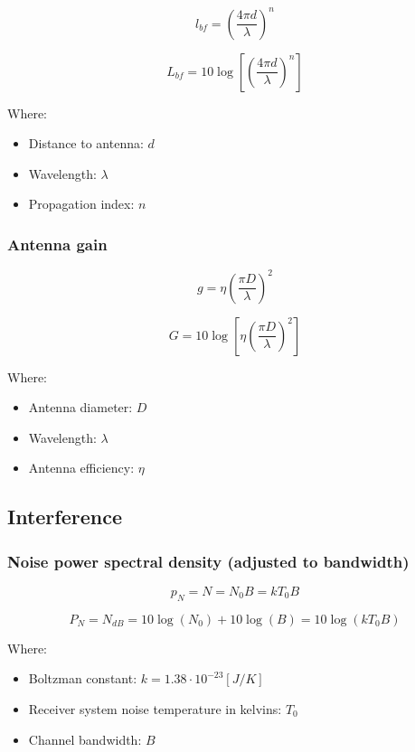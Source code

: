 \documentclass[../main.tex]{subfiles}
\begin{document}
$$
	l_{bf} = \left( \frac {4 \pi d} {\lambda} \right)^n
$$

$$
	L_{bf} = 10 \log \left[ \left( \frac {4 \pi d} {\lambda} \right)^n \right]
$$

Where:

\begin{itemize}
	\item Distance to antenna: $d$
	\item Wavelength: $\lambda$
	\item Propagation index: $n$
\end{itemize}

\subsubsection{Antenna gain}

$$
	g = \eta \left( \frac {\pi D} {\lambda} \right)^2
$$

$$
	G = 10 \log \left[ \eta \left( \frac {\pi D} {\lambda} \right)^2 \right]
$$

Where:

\begin{itemize}
	\item Antenna diameter: $D$
	\item Wavelength: $\lambda$
	\item Antenna efficiency: $\eta$
\end{itemize}

\subsection{Interference}

\subsubsection{Noise power spectral density (adjusted to bandwidth)}

$$
	p_N = N = N_0 B = k T_0 B
$$

$$
	P_N = N_{dB} = 10 \log (N_0) + 10 \log (B) = 10 \log (k T_0 B)
$$

Where:

\begin{itemize}
	\item Boltzman constant: $k = 1.38 \cdot 10^{-23} [J/K]$
	\item Receiver system noise temperature in kelvins: $T_0$
	\item Channel bandwidth: $B$
\end{itemize}
\end{document}
